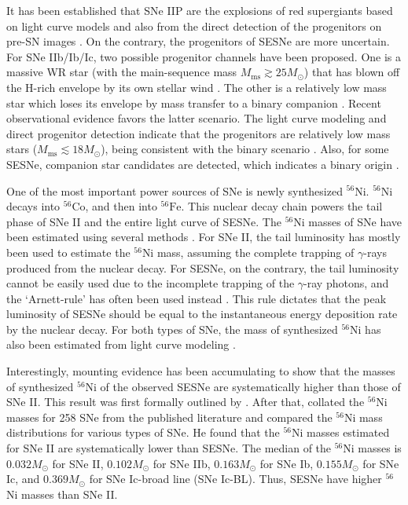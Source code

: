 \documentclass[twocolumn, linenumbers]{aastex62}
\begin{document}
It has been established that SNe IIP are the explosions of red supergiants based on light curve models \citep{1977ApJS...33..515F, 2003MNRAS.338..939E, 2011ApJ...729...61B} and also from the direct detection of the progenitors on pre-SN images \citep{2009ARA&A..47...63S, 2015PASA...32...16S}. 
On the contrary, the progenitors of SESNe are more uncertain. For SNe IIb/Ib/Ic, two possible progenitor channels have been proposed. One is a massive WR star (with the main-sequence mass $M_{\mathrm{ms}} \gtrsim 25 M_{\odot}$) that has blown off the H-rich envelope by its own stellar wind \citep{2012A&A...538L...8G, 2016MNRAS.455..112G}. The other is a relatively low mass star which loses its envelope by mass transfer to a binary companion \citep{1992ApJ...391..246P, 2009MNRAS.396.1699S}. Recent observational evidence favors the latter scenario. The light curve modeling and direct progenitor detection indicate that the progenitors are relatively low mass stars ($M_{\mathrm{ms}} \lesssim 18 M_{\odot}$), being consistent with the binary scenario \citep{2011ApJ...739L..37M, 2014AJ....148...68B, 2014AJ....147...37V, 2015ApJ...811..147F}. Also, for some SESNe, companion star candidates are detected, which indicates a binary origin \citep{2004Natur.427..129M, 2014ApJ...793L..22F}.

One of the most important power sources of SNe is newly synthesized $^{56}$Ni. $^{56}\mathrm{Ni}$ decays into $^{56}\mathrm{Co}$, and then into $^{56}\mathrm{Fe}$. This nuclear decay chain powers the tail phase of SNe II and the entire light curve of SESNe. The $^{56}$Ni masses of SNe have been estimated using several methods \citep{2019A&A...628A...7A}. For SNe II, the tail luminosity has mostly been used to estimate the $^{56}$Ni mass, assuming the complete trapping of $\gamma$-rays produced from the nuclear decay. For SESNe, on the contrary, the tail luminosity cannot be easily used due to the incomplete trapping of the $\gamma$-ray photons, and the `Arnett-rule' has often been used instead \citep{1982ApJ...253..785A, 2015MNRAS.450.1295W}. This rule dictates that the peak luminosity of SESNe should be equal to the instantaneous energy deposition rate by the nuclear decay.
For both types of SNe, the mass of synthesized $^{56}$Ni has also been estimated from light curve modeling \citep{2011A&A...532A.100U, 2014AJ....148...68B}. 


Interestingly, mounting evidence has been accumulating to show that the masses of synthesized $^{56}$Ni of the observed SESNe are systematically higher than those of SNe II. This result was first formally outlined by \citet{2015arXiv150602655K}. After that, \citet{2019A&A...628A...7A} collated the $^{56}$Ni masses for 258 SNe from the published literature and compared the $^{56}$Ni mass distributions for various types of SNe. He found that the $^{56}$Ni masses estimated for SNe II are systematically lower than SESNe. The median of the $^{56}$Ni masses is $0.032M_{\odot}$ for SNe II, $0.102M_{\odot}$ for SNe IIb, $0.163M_{\odot}$ for SNe Ib, $0.155M_{\odot}$ for SNe Ic, and $0.369M_{\odot}$ for SNe Ic-broad line (SNe Ic-BL). Thus, SESNe have higher $^{56}$Ni masses than SNe II.
\end{document}
